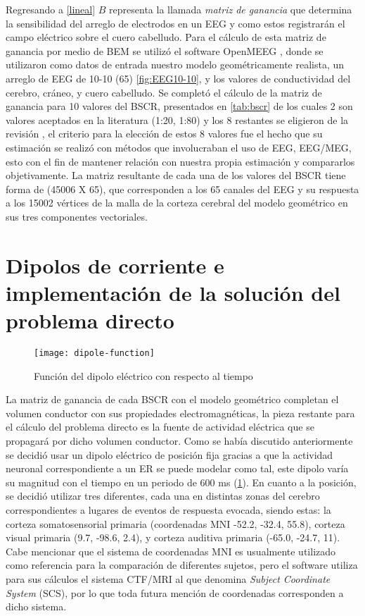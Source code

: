 Regresando a \cref{lineal} $B$ representa la llamada \emph{matriz de ganancia} que determina la sensibilidad del arreglo de electrodos en un EEG y como estos registrarán el campo eléctrico sobre el cuero cabelludo.
Para el cálculo de esta matriz de ganancia por medio de BEM se utilizó el software OpenMEEG \cite{open,open2}, donde se utilizaron como datos de entrada nuestro modelo geométricamente realista, un arreglo de EEG de 10-10 (65) \cref{fig:EEG10-10}, y los valores de conductividad del cerebro, cráneo, y cuero cabelludo.
Se completó el cálculo de la matriz de ganancia para 10 valores del BSCR, presentados en \cref{tab:bscr} de los cuales 2 son valores aceptados en la literatura (1:20, 1:80) y los 8 restantes se eligieron de la revisión \cite{McCann2019} , el criterio para la elección de estos 8 valores fue el hecho que su estimación se realizó con métodos que involucraban el uso de EEG, EEG/MEG, esto con el fin de mantener relación con nuestra propia estimación y compararlos objetivamente.
La matriz resultante de cada una de los valores del BSCR tiene forma de (45006 X 65), que corresponden a los 65 canales del EEG y su respuesta a los 15002 vértices de la malla de la corteza cerebral del modelo geométrico en sus tres componentes vectoriales.

\section{Dipolos de corriente e implementación de la solución del problema directo}
\label{sec:methodology:direct_solved}

\begin{figure}[tb]
	\centering
	\texttt{[image: dipole-function]}
	\caption{Función del dipolo eléctrico con respecto al tiempo }
	\label{fig:methodology:dipole}
\end{figure}

La matriz de ganancia de cada BSCR con el modelo geométrico completan el volumen conductor con sus propiedades electromagnéticas, la pieza restante para el cálculo del problema directo es la fuente de actividad eléctrica que se propagará por dicho volumen conductor.
Como se había discutido anteriormente se decidió usar un dipolo eléctrico de posición fija gracias a que la actividad neuronal correspondiente a un ER se puede modelar como tal, este dipolo varía su magnitud con el tiempo en un periodo de 600 ms (\cref{fig:methodology:dipole}).
En cuanto a la posición, se decidió utilizar tres diferentes, cada una en distintas zonas del cerebro correspondientes a lugares de eventos de respuesta evocada, siendo estas: la corteza somatosensorial primaria (coordenadas MNI -52.2, -32.4, 55.8), corteza visual primaria (9.7, -98.6, 2.4), y corteza auditiva primaria (-65.0, -24.7, 11).
Cabe mencionar que el sistema de coordenadas MNI es usualmente utilizado como referencia para la comparación de diferentes sujetos, pero el software utiliza para sus cálculos el sistema CTF/MRI al que denomina \emph{Subject Coordinate System} (SCS), por lo que toda futura mención de coordenadas corresponden a dicho sistema.

